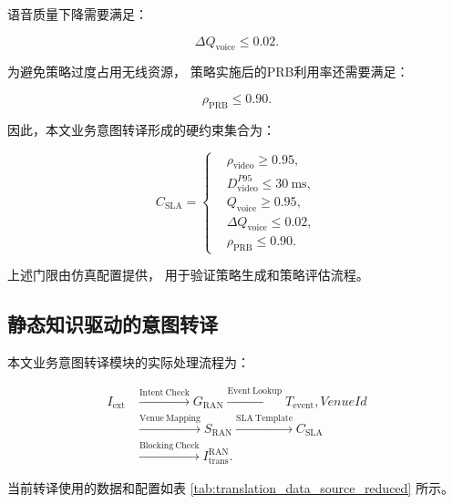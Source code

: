 \documentclass[lang=cn,12pt]{elegantbook}
\begin{document}
语音质量下降需要满足：

\begin{equation}
\Delta Q_{\mathrm{voice}}
\leq
0.02.
\label{eq:translated_voice_degradation_sla}
\end{equation}

为避免策略过度占用无线资源，
策略实施后的PRB利用率还需要满足：

\begin{equation}
\rho_{\mathrm{PRB}}
\leq
0.90.
\label{eq:translated_prb_sla}
\end{equation}

因此，本文业务意图转译形成的硬约束集合为：

\begin{equation}
C_{\mathrm{SLA}}
=
\left\{
\begin{aligned}
&\rho_{\mathrm{video}}\geq0.95,\\
&D_{\mathrm{video}}^{P95}\leq30~\mathrm{ms},\\
&Q_{\mathrm{voice}}\geq0.95,\\
&\Delta Q_{\mathrm{voice}}\leq0.02,\\
&\rho_{\mathrm{PRB}}\leq0.90.
\end{aligned}
\right.
\label{eq:translated_sla_set}
\end{equation}

上述门限由仿真配置提供，
用于验证策略生成和策略评估流程。


\subsection*{静态知识驱动的意图转译}

本文业务意图转译模块的实际处理流程为：

\begin{equation}
\begin{aligned}
I_{\mathrm{ext}}
&\xrightarrow{\mathrm{Intent\ Check}}
G_{\mathrm{RAN}}
\xrightarrow{\mathrm{Event\ Lookup}}
T_{\mathrm{event}},VenueId
\\
&\xrightarrow{\mathrm{Venue\ Mapping}}
S_{\mathrm{RAN}}
\xrightarrow{\mathrm{SLA\ Template}}
C_{\mathrm{SLA}}
\\
&\xrightarrow{\mathrm{Blocking\ Check}}
I_{\mathrm{trans}}^{\mathrm{RAN}}.
\end{aligned}
\label{eq:static_translation_flow_reduced}
\end{equation}

当前转译使用的数据和配置如表
\ref{tab:translation_data_source_reduced}
所示。
\end{document}
